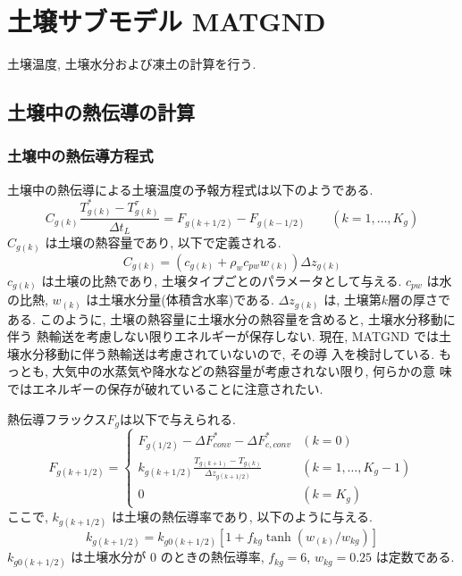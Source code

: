 \section{土壌サブモデル MATGND}

土壌温度, 土壌水分および凍土の計算を行う.

\subsection{土壌中の熱伝導の計算}

\subsubsection{土壌中の熱伝導方程式}

土壌中の熱伝導による土壌温度の予報方程式は以下のようである.
\begin{equation}
C_{g(k)} \frac{T_{g(k)}^* - T_{g(k)}^{\tau}}{\Delta t_L} = F_{g(k+1/2)} - F_{g(k-1/2)}
\qquad (k=1,\ldots,K_{g})
\label{gnd_diff}
\end{equation}
$C_{g(k)}$ は土壌の熱容量であり, 以下で定義される.
\begin{equation}
 C_{g(k)} = ( c_{g(k)} + \rho_w c_{pw} w_{(k)} ) \Delta z_{g(k)}
\end{equation}
$c_{g(k)}$ は土壌の比熱であり, 土壌タイプごとのパラメータとして与える.
$c_{pw}$ は水の比熱, $w_{(k)}$ は土壌水分量(体積含水率)である.
$\Delta z_{g(k)}$ は, 土壌第$k$層の厚さである.
このように, 土壌の熱容量に土壌水分の熱容量を含めると, 土壌水分移動に伴う
熱輸送を考慮しない限りエネルギーが保存しない.
現在, MATGND では土壌水分移動に伴う熱輸送は考慮されていないので, その導
入を検討している.
もっとも, 大気中の水蒸気や降水などの熱容量が考慮されない限り, 何らかの意
味ではエネルギーの保存が破れていることに注意されたい.

熱伝導フラックス$F_{g}$は以下で与えられる.
\begin{equation}
 F_{g(k+1/2)} =
\left\{
\begin{array}{ll}
F_{g(1/2)} - \Delta F_{conv}^* - \Delta F_{c,conv}^*
& (k=0)\\
\displaystyle{
k_{g(k+1/2)} \frac{T_{g(k+1)} - T_{g(k)}}{\Delta z_{g(k+1/2)}}
}
& (k=1,\ldots,K_{g}-1) \\
\displaystyle{
0
}
& (k=K_{g})
\end{array}
\right.
\label{gnd_dflux}
\end{equation}
ここで, $k_{g(k+1/2)}$ は土壌の熱伝導率であり, 以下のように与える.
\begin{equation}
 k_{g(k+1/2)} = k_{g0(k+1/2)} [ 1 + f_{kg} \tanh( w_{(k)}/ w_{kg} ) ]
\end{equation}
$k_{g0(k+1/2)}$ は土壌水分が $0$ のときの熱伝導率, $f_{kg}=6$,
$w_{kg}=0.25$ は定数である.

